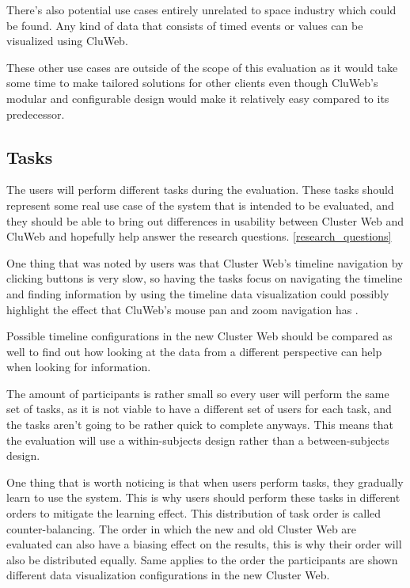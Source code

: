 There's also potential use cases entirely unrelated to space industry which could be found. Any kind of data that consists of timed events or values can be visualized using CluWeb.

These other use cases are outside of the scope of this evaluation as it would take some time to make tailored solutions for other clients even though CluWeb's modular and configurable design would make it relatively easy compared to its predecessor.

\cite{rubin2008handbook, albert2013measuring}

\subsection{Tasks}
The users will perform different tasks during the evaluation. These tasks should represent some real use case of the system that is intended to be evaluated, and they should be able to bring out differences in usability between Cluster Web and CluWeb and hopefully help answer the research questions. \ref{research_questions}

One thing that was noted by users was that Cluster Web's timeline navigation by clicking buttons is very slow, so having the tasks focus on navigating the timeline and finding information by using the timeline data visualization could possibly highlight the effect that CluWeb's mouse pan and zoom navigation has .

Possible timeline configurations in the new Cluster Web should be compared as well to find out how looking at the data from a different perspective can help when looking for information.

The amount of participants is rather small so every user will perform the same set of tasks, as it is not viable to have a different set of users for each task, and the tasks aren't going to be rather quick to complete anyways. This means that the evaluation will use a within-subjects design rather than a between-subjects design. 

One thing that is worth noticing is that when users perform tasks, they gradually learn to use the system. This is why users should perform these tasks in different orders to mitigate the learning effect. This distribution of task order is called counter-balancing. The order in which the new and old Cluster Web are evaluated can also have a biasing effect on the results, this is why their order will also be distributed equally. Same applies to the order the participants are shown different data visualization configurations in the new Cluster Web.
\cite{rubin2008handbook}

